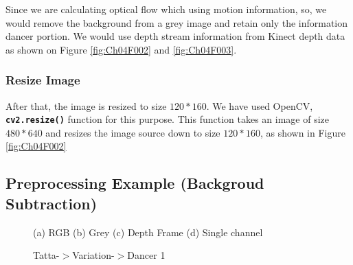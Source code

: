 Since we are calculating optical flow which using motion information, so, we would remove the background from a grey image and retain only the information dancer portion. We would use depth stream information from Kinect depth
data as shown on Figure \ref{fig:Ch04F002} and \ref{fig:Ch04F003}.

\subsubsection{Resize Image}
After that, the image is resized to size $120 \ast 160$. We have used OpenCV, \texttt{\textbf{cv2.resize()}} function for this purpose. This function takes an image of size $480 \ast 640$ and resizes the image source down to size $120 \ast 160$, as shown in Figure \ref{fig:Ch04F002}
    





\subsection{Preprocessing Example (Backgroud Subtraction)}
\begin{figure}
    \centering
    \caption{(a) RGB (b) Grey (c) Depth Frame (d) Single channel}
    \caption{Tatta-$>$Variation-$>$Dancer 1}
    \label{fig:Ch04F004}
\end{figure}
 
